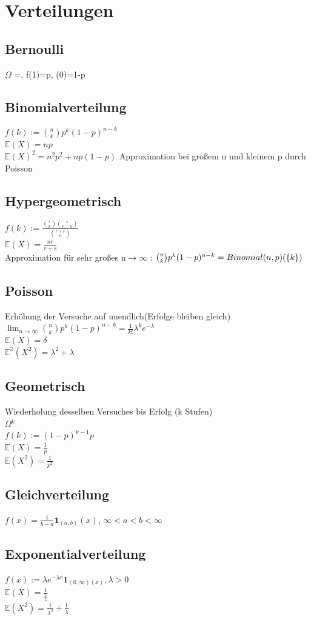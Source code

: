 \documentclass[]{article}
\begin{document}
\section{Verteilungen}
\subsection{Bernoulli}
$\Omega$ =, f(1)=p, (0)=1-p
\subsection{Binomialverteilung}
$f(k):=\binom{n}{k}p^k(1-p)^{n-k}$\\
$\mathbb{E}(X)=n p$\\
$\mathbb{E}(X)^2=n^2 p^2+np(1-p)$
Approximation bei großem n und kleinem p durch Poisson 
\subsection{Hypergeometrisch}
$f(k):= \frac{\binom{r}{k}\binom{s}{n-k}}{\binom{r+s}{n}}$\\
$\mathbb{E}(X)=\frac{nr}{r+s}$\\
Approximation für sehr großes n$\rightarrow\infty$	: $\binom{n}{k}p^k(1-p)^{n-k}=Binomial(n,p)(\set{k})$
\subsection{Poisson}
Erhöhung der Versuche auf unendlich(Erfolge bleiben gleich)
$\lim_{n \rightarrow \infty} \binom{n}{k}p^k(1-p)^{n-k} = \frac{1}{k!}\lambda^k e^{-\lambda} $\\
$\mathbb{E}(X)=\delta$\\
$\mathbb{E^2}(X^2)=\lambda^2+ \lambda$
\subsection{Geometrisch}
Wiederholung desselben Versuches bis Erfolg (k Stufen)\\
$\Omega$$^k$\\
$f(k):=(1-p)^{k-1}p$\\
$\mathbb{E}(X)=\frac{1}{p}$\\
$\mathbb{E}(X^2)=\frac{1}{p^2}$
\subsection{Gleichverteilung}$f(x)=\frac{1}{b-a}\mathbf{1}_{(a,b)}(x)$, $ \infty <a<b<\infty$
\subsection{Exponentialverteilung}
$f(x):=\lambda e^{-\lambda x} \mathbf{1}_{(0,\infty)(x)}, \lambda >0$\\
$\mathbb{E}(X)=\frac{1}{\frac{1}{\lambda}}$\\
$\mathbb{E}(X^2)=\frac{1}{\lambda^2}+\frac{1}{\lambda}$
\end{document}
